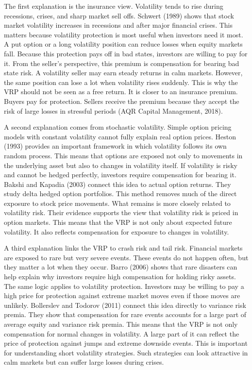 \documentclass[11pt,a4paper]{article}
\begin{document}
The first explanation is the insurance view. Volatility tends to rise during recessions, crises, and sharp market sell offs. Schwert (1989) shows that stock market volatility increases in recessions and after major financial crises. This matters because volatility protection is most useful when investors need it most. A put option or a long volatility position can reduce losses when equity markets fall. Because this protection pays off in bad states, investors are willing to pay for it. From the seller's perspective, this premium is compensation for bearing bad state risk. A volatility seller may earn steady returns in calm markets. However, the same position can lose a lot when volatility rises suddenly. This is why the VRP should not be seen as a free return. It is closer to an insurance premium. Buyers pay for protection. Sellers receive the premium because they accept the risk of large losses in stressful periods (AQR Capital Management, 2018).

A second explanation comes from stochastic volatility. Simple option pricing models with constant volatility cannot fully explain real option prices. Heston (1993) provides an important framework in which volatility follows its own random process. This means that options are exposed not only to movements in the underlying asset but also to changes in volatility itself. If volatility is risky and cannot be hedged perfectly, investors require compensation for bearing it. Bakshi and Kapadia (2003) connect this idea to actual option returns. They study delta hedged option portfolios. This method removes much of the direct exposure to stock price movements. What remains is more closely related to volatility risk. Their evidence supports the view that volatility risk is priced in option markets. This means that the VRP is not only about expected future volatility. It also reflects compensation for exposure to changes in volatility.

A third explanation links the VRP to crash risk and tail risk. Financial markets are exposed to rare but very severe events. These events do not happen often, but they matter a lot when they occur. Barro (2006) shows that rare disasters can help explain why investors require high compensation for holding risky assets. The same logic applies to volatility protection. Investors may be willing to pay a high price for protection against extreme market moves even if those moves are unlikely. Bollerslev and Todorov (2011) connect this idea directly to variance risk premia. They show that compensation for rare events accounts for a large part of average equity and variance risk premia. This means that the VRP is not only compensation for normal changes in volatility. A large part of it can reflect the price of protection against jumps and extreme downside events. This is important for understanding short volatility strategies. Such strategies can look attractive in calm markets but can suffer large losses during crises.
\end{document}
